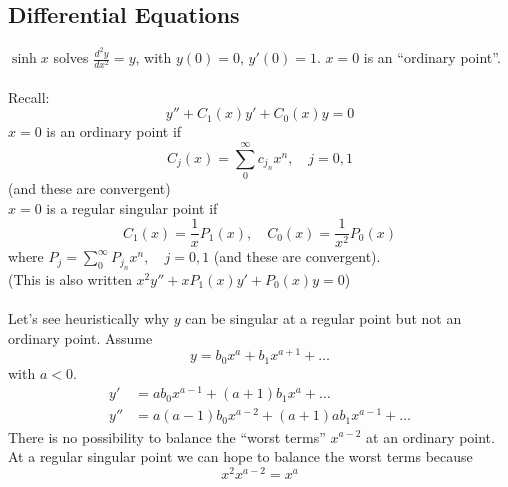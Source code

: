 \documentclass{article}
\begin{document}
\subsection*{Differential Equations}
$\sinh x$ solves $\displaystyle \frac{d^2y}{dx^2} = y$, with $y(0)=0$, 
$y'(0)=1$. $x=0$ is an ``ordinary point''.
\\
\\
Recall:
\[ y'' + C_1(x) y' + C_0(x) y =0 \]
$x=0$ is an ordinary point if
\[ C_j(x) = \sum_0^{\infty} c_{j_n}x^n, \quad j = 0,1\]
(and these are convergent)
\\
$x=0$ is a regular singular point if 
\[ C_1(x) = \frac{1}{x} P_1(x), \quad C_0(x) = \frac{1}{x^2}P_0(x) \]
where $\displaystyle P_j = \sum_0^{\infty} P_{j_n} x^n, \quad j=0,1$
(and these are convergent).
\\
(This is also written $x^2 y'' + xP_1(x) y' + P_0(x)y =0$)
\\
\\
Let's see heuristically why $y$ can be singular at a regular point but
not an ordinary point. Assume
\[ y = b_0 x^a + b_1 x^{a+1} + \dots \]
with $a<0$.
\begin{align*}
 y' &= ab_0 x^{a-1} + (a+1)b_1 x^{a} + \dots \\
 y'' &= a(a-1)b_0 x^{a-2} + (a+1)ab_1 x^{a-1} + \dots 
\end{align*}
There is no possibility to balance the ``worst terms'' $x^{a-2}$ at
an ordinary point. At a regular singular point we can hope to balance the 
worst terms because
\[ x^2 x^{a-2} = x^a \]
\end{document}
